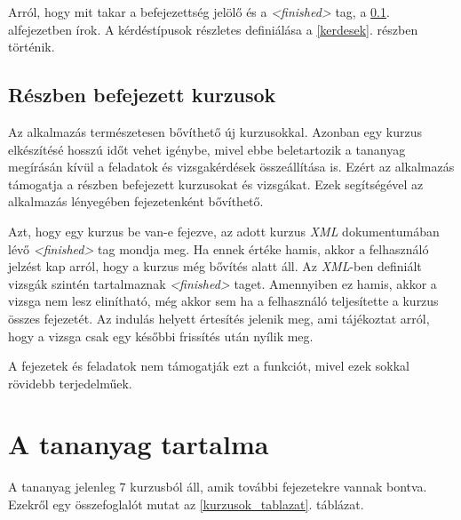 \documentclass[12pt,a4paper]{article}
\newcommand{\xml}{\textit{XML}\xspace}
\begin{document}
	Arról, hogy mit takar a befejezettség jelölő és a \textit{<finished>} tag, a \ref{reszben_befejezett_kurzusok}. alfejezetben írok. A kérdéstípusok részletes definiálása a \ref{kerdesek}. részben történik.
	
	\subsection{Részben befejezett kurzusok}\label{reszben_befejezett_kurzusok}
	
	Az alkalmazás természetesen bővíthető új kurzusokkal. Azonban egy kurzus elkészítésé hosszú időt vehet igénybe, mivel ebbe beletartozik a tananyag megírásán kívül a feladatok és vizsgakérdések összeállítása is. Ezért az alkalmazás támogatja a részben befejezett kurzusokat és vizsgákat. Ezek segítségével az alkalmazás lényegében fejezetenként bővíthető.
	
	Azt, hogy egy kurzus be van-e fejezve, az adott kurzus \xml dokumentumában lévő \textit{<finished>} tag mondja meg. Ha ennek értéke hamis, akkor a felhasználó jelzést kap arról, hogy a kurzus még bővítés alatt áll. Az \xml-ben definiált vizsgák szintén tartalmaznak  \textit{<finished>} taget. Amennyiben ez hamis, akkor a vizsga nem lesz elinítható, még akkor sem ha a felhasználó teljesítette a kurzus összes fejezetét. Az indulás helyett értesítés jelenik meg, ami tájékoztat arról, hogy a vizsga csak egy későbbi frissítés után nyílik meg.
	
	A fejezetek és feladatok nem támogatják ezt a funkciót, mivel ezek sokkal rövidebb terjedelműek.
	
	\section{A tananyag tartalma}
	
	A tananyag jelenleg 7 kurzusból áll, amik további fejezetekre vannak bontva. Ezekről egy összefoglalót mutat az \ref{kurzusok_tablazat}. táblázat.
	
\end{document}

